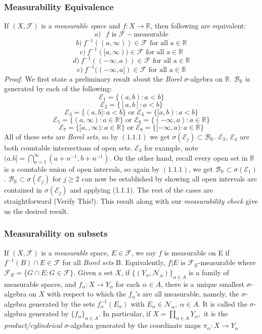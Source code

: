 \documentclass{article}
\begin{document}
\subsubsection{Measurability Equivalence}
If $(X, \mathcal{F})$ is a \emph{measurable space} and $f:X\to\mathbb{R}$, then following are equivalent:
\[
a) \text{ $f$ is } \text{$\mathcal{F}-$measurable}
\]
\[
b) \ f^{-1}((a,\infty)) \in \mathcal{F} \text{ for all a}\in \mathbb{R}
\]
\[
c) \  f^{-1}([a,\infty)) \in \mathcal{F} \text{ for all a}\in \mathbb{R}
\]
\[
d) \  f^{-1}((-\infty,a)) \in \mathcal{F} \text{ for all a}\in \mathbb{R}
\]
\[
e) \  f^{-1}((-\infty,a]) \in \mathcal{F} \text{ for all a}\in \mathbb{R}
\]
\textit{Proof.} \newline \newline
We first state a preliminary result about the \emph{Borel} $\sigma$-algebra on $\mathbb{R}$.
$\mathcal{B}_\mathbb{R}$ is generated by each of the following:
\[
\mathcal{E}_1=\{(a,b):a<b\}
\]
\[
\mathcal{E}_2=\{[a,b]:a<b\}
\]
\[
\mathcal{E}_3=\{(a,b]:a<b\} \text{ or } \mathcal{E}_4=\{[a,b):a<b\}
\]
\[
\mathcal{E}_5=\{(a,\infty):a\in\mathbb{R}\} \text{ or } \mathcal{E}_6=\{(-\infty,a):a\in\mathbb{R}\}
\]
\[
\mathcal{E}_7=\{[a,,\infty):a\in\mathbb{R}\} \text{ or } \mathcal{E}_8=\{[-\infty,a):a\in\mathbb{R}\}
\]
All of these sets are \emph{Borel sets}, so by $(1.1.1)$ we get $\sigma(\mathcal{E}_j)\subset\mathcal{B}_\mathbb{R}$. $\mathcal{E}_3, \  \mathcal{E}_4 $ are both countable intersections of open sets. $\mathcal{E}_3$ for example, note $(a.b]=\bigcap_{n=1}^{\infty}(a+n^{-1},b+n^{-1})$. On the other hand, recall every open set in $\mathbb{R}$ is a countable union of open intervals, so again by  $(1.1.1)$, we get $\mathcal{B}_\mathbb{R}\subset\sigma(\mathcal{E}_1)$. $\mathcal{B}_\mathbb{R}\subset\sigma(\mathcal{E}_j)$ for $j\geq2$ can now be established by showing all open intervals are contained in $\sigma(\mathcal{E}_j)$ and applying (1.1.1). The rest of the cases are straightforward (Verify This!). \newline \newline
This result along with our \emph{measurability check} give us the desired result.
\subsubsection{Measurability on subsets}
If $(X,\mathcal{F})$ is a \emph{measurable} space, $E\in\mathcal{F}$, we say $f$ is measurable on E if $f^{-1}(B)\cap E \in\mathcal{F}$ for all \emph{Borel sets} B. Equivalently, $f|E \text{ is }\mathcal{F}_E$-measurable where $\mathcal{F}_E=\{G\cap E:G\in\mathcal{F}\}$. Given a set $X$, if $\{(Y_\alpha,\mathcal{N}_\alpha)\}_{\alpha\in A}$ is a family of measurable spaces, and $f_\alpha:X\to Y_\alpha$ for each $\alpha \in A$, there is a unique smallest $\sigma$-algebra on $X$ with respect to which the $f_\alpha$'s are all measurable, namely, the $\sigma$-algebra generated by the sets $f_\alpha^{-1}(E_\alpha)$ with $E_\alpha \in \mathcal{N}_\alpha, \ \alpha \in A$. It is called the $\sigma$-algebra generated by $\{f_\alpha\}_{\alpha \in A}$. In particular, if $X = \prod_{\alpha\in A}Y_\alpha,$ it is the \emph{product/cylindrical} $\sigma$-algebra generated by the coordinate maps $\pi_\alpha:X\to Y_\alpha$
\end{document}
